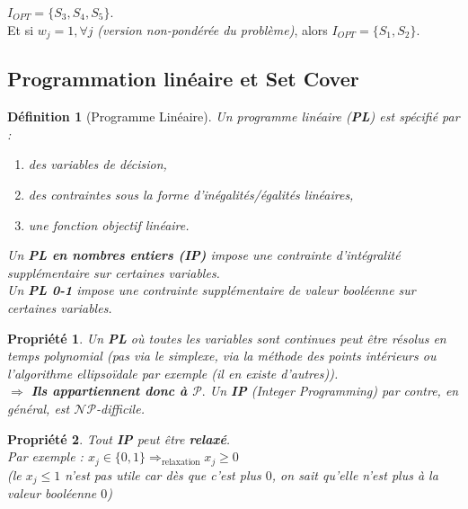 \documentclass{article}
\newcommand{\titre}[1]{\textcolor{title}{#1}}
\newtheorem{de}{D\'efinition}[section]
\newtheorem{propriete}{Propri\'et\'e}[section]
\begin{document}
\begin{sffamily}
$I_{OPT} = \{S_3,S_4,S_5\}$. \\
\indent Et si $w_j = 1, \forall j$ \textit{(version non-pondérée du problème)}, alors $I_{OPT} = \{S_1,S_2\}$.

\subsection{Programmation linéaire et Set Cover}

\begin{de}[Programme Linéaire]
Un programme linéaire (\titre{\textbf{PL}}) est spécifié par :
\begin{enumerate}
\item des variables de décision,
\item des contraintes sous la forme d'inégalités/égalités linéaires,
\item une fonction objectif linéaire.
\end{enumerate}
Un \textbf{\titre{PL} en nombres entiers (\titre{IP})} impose une contrainte d'intégralité supplémentaire sur certaines variables.\\
Un \textbf{\titre{PL} 0-1} impose une contrainte supplémentaire de valeur booléenne sur certaines variables.\\
\end{de}
\begin{propriete}
Un \textbf{\titre{PL}} où toutes les variables sont continues peut être résolus en temps polynomial (pas via le simplexe, via la méthode
des points intérieurs ou l'algorithme ellipsoïdale par exemple (il en existe d'autres)).\\
\indent $\Rightarrow$ \textbf{Ils appartiennent donc à $\mathcal{P}.$} Un \textbf{\titre{IP}} \textit{(Integer Programming)} par contre,
en général, est $\mathcal{NP}$-\textit{difficile}.
\end{propriete}

\begin{propriete}
Tout \textbf{\titre{IP}} peut être \textbf{relaxé}. \\
Par exemple : $x_j \in \{0,1\} \Rightarrow_{\text{relaxation}} x_j \geq 0$\\
(le $x_j \leq 1$ n'est pas utile car dès que c'est plus $0$, on sait qu'elle n'est plus à la valeur booléenne $0$)
\end{propriete}
$ $\\$ $\\$ $\\$ $\\$ $\\$ $\\


\end{sffamily}
\end{document}
